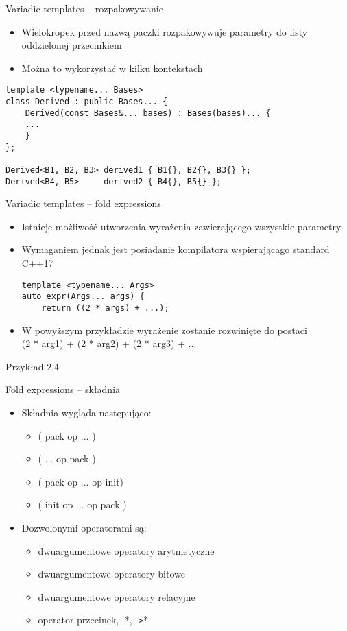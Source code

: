 \documentclass[11pt]{beamer}
\begin{document}
\begin{frame}[fragile]{Variadic templates -- rozpakowywanie}
    \begin{itemize}
        \item Wielokropek przed nazwą paczki rozpakowywuje parametry do listy oddzielonej przecinkiem
        \item Można to wykorzystać w kilku kontekstach
    \end{itemize}
    \begin{lstlisting}[frame=single]
template <typename... Bases>
class Derived : public Bases... {
    Derived(const Bases&... bases) : Bases(bases)... {
    ...
    }
};

Derived<B1, B2, B3> derived1 { B1{}, B2{}, B3{} };
Derived<B4, B5>     derived2 { B4{}, B5{} };
    \end{lstlisting}
\end{frame}

\begin{frame}[fragile]{Variadic templates -- fold expressions}
    \begin{itemize}
        \item Istnieje możliwość utworzenia wyrażenia zawierającego wszystkie parametry
        \item Wymaganiem jednak jest posiadanie kompilatora wspierającago standard C++17
    \begin{lstlisting}[frame=single]
template <typename... Args>
auto expr(Args... args) {
    return ((2 * args) + ...);
    \end{lstlisting}
        \item W powyższym przykładzie wyrażenie zostanie rozwinięte do postaci\\(2 * arg1) + (2 * arg2) + (2 * arg3) + ...
    \end{itemize} 
    \alert{Przykład 2.4}
\end{frame}

\begin{frame}[fragile]{Fold expressions -- składnia}
    \begin{itemize}
        \item Składnia wygląda następująco:
        \begin{itemize}
            \item ( pack op ... )
            \item ( ... op pack )
            \item ( pack op ... op init)
            \item ( init op ... op pack )
        \end{itemize}
        \item Dozwolonymi operatorami są:
        \begin{itemize}
            \item dwuargumentowe operatory arytmetyczne
            \item dwuargumentowe operatory bitowe
            \item dwuargumentowe operatory relacyjne
            \item operator przecinek, .*, -\verb|>|*
        \end{itemize}
    \end{itemize}
\end{frame}
\end{document}
